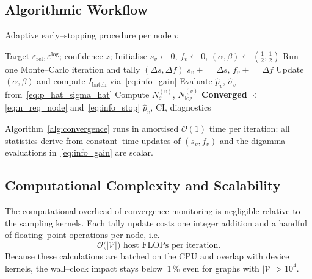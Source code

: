\subsection{Algorithmic Workflow}
\label{subsec:workflow}

\begin{algorithm}[H]
  \caption{Adaptive early--stopping procedure per node $v$}
  \label{alg:convergence}
  \begin{algorithmic}[1]
    \Require Target $\varepsilon_{\mathrm{rel}},\varepsilon^{\log}$; confidence $z$; \vspace{1pt}
    \State Initialise $s_v\gets 0$, $f_v\gets 0$, $(\alpha,\beta)\gets(\tfrac12,\tfrac12)$
      \State Run one Monte--Carlo iteration and tally $(\Delta s,\Delta f)$
      \State $s_v\mathrel{+}=\Delta s$, \quad $f_v\mathrel{+}=\Delta f$
      \State Update $(\alpha,\beta)$ and compute $I_{\text{batch}}$ via~\eqref{eq:info_gain}
      \State Evaluate $\widehat{p}_v$, $\widehat{\sigma}_v$ from~\eqref{eq:p_hat_sigma_hat}
      \State Compute $N_{\varepsilon}^{(v)}$, $N^{(v)}_{\log}$
      \State \textbf{Converged} $\Leftarrow$ \eqref{eq:n_req_node} and~\eqref{eq:info_stop}
    \EndWhile
    \State \Return $\widehat{p}_v$, CI, diagnostics
  \end{algorithmic}
\end{algorithm}
Algorithm~\ref{alg:convergence} runs in amortised $\mathcal{O}(1)$ time per
iteration: all statistics derive from constant--time updates of $(s_v,f_v)$
and the digamma evaluations in~\eqref{eq:info_gain} are scalar.

\subsection{Computational Complexity and Scalability}
\label{subsec:conv_complexity}

The computational overhead of convergence monitoring is negligible relative to
the sampling kernels.  Each tally update costs one integer addition and a
handful of floating--point operations per node, i.e.
\begin{equation}
  \mathcal{O}\bigl(|\mathcal{V}|\bigr) \text{ host FLOPs per iteration.}
\end{equation}
Because these calculations are batched on the CPU and overlap with device
kernels, the wall--clock impact stays below~1\,\% even for graphs with
$|\mathcal{V}|>10^{4}$.


